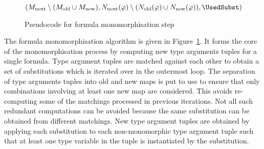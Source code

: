 \documentclass[runningheads]{llncs}
\begin{document}
\begin{figure}[t!]
\begin{algorithm}[H]
{   

   \BlankLine

   \Return \((M_{\text{next}}\setminus (M_{\text{old}} \cup M_{\text{new}}), N_{\text{next}}(\varphi)\setminus (N_{\text{old}}(\varphi)\cup N_{\text{new}}(\varphi)), \UsedSubst)\)
}

\end{algorithm}
\caption{Pseudocode for formula monomorphisation step}
\label{mono_step}
\end{figure}


The formula monomorphisation algorithm is given in Figure~\ref{mono_step}. It forms the core of the monomorphisation process by computing new type arguments tuples for a single formula. Type argument tuples are matched against each other to obtain a set of substitutions which is iterated over in the outermost loop. 
The separation of type arguments tuples into old and new maps is put to use to ensure that only combinations involving at least one new map are considered. This avoids re-computing some of the matchings processed in previous iterations. Not all such redundant computations can be avoided because the same substitution can be obtained from different matchings. New type argument tuples are obtained by applying each substitution to each non-monomorphic type argument tuple such that at least one type variable in the tuple is instantiated by the substitution.
\end{document}
